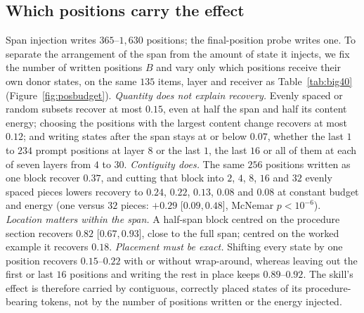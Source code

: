 
\subsection{Which positions carry the effect}
\label{sec:posbudget}

Span injection writes $365$--$1{,}630$ positions; the final-position probe
writes one. To separate the arrangement of the span from the amount of state
it injects, we fix the number of written positions $B$ and vary only which
positions receive their own donor states, on the same $135$ items, layer and
receiver as Table~\ref{tab:big40} (Figure~\ref{fig:posbudget}).
\emph{Quantity does not explain recovery.} Evenly spaced or random subsets
recover at most $0.15$, even at half the span and half its content energy;
choosing the positions with the largest content change recovers at most
$0.12$; and writing states after the span stays at or below $0.07$, whether
the last $1$ to $234$ prompt positions at layer $8$ or the last $1$, the last
$16$ or all of them at each of seven layers from $4$ to $30$.
\emph{Contiguity does.} The same $256$ positions written as one block recover
$0.37$, and cutting that block into $2$, $4$, $8$, $16$ and $32$ evenly spaced
pieces lowers recovery to $0.24$, $0.22$, $0.13$, $0.08$ and $0.08$ at constant
budget and energy (one versus $32$ pieces: $+0.29$ [$0.09,0.48$], McNemar
$p<10^{-6}$). \emph{Location matters within the span.} A half-span block
centred on the procedure section recovers $0.82$ [$0.67,0.93$], close to the
full span; centred on the worked example it recovers $0.18$. \emph{Placement
must be exact.} Shifting every state by one position recovers $0.15$--$0.22$
with or without wrap-around, whereas leaving out the first or last $16$
positions and writing the rest in place keeps $0.89$--$0.92$. The skill's
effect is therefore carried by contiguous, correctly placed states of its
procedure-bearing tokens, not by the number of positions written or the
energy injected.


